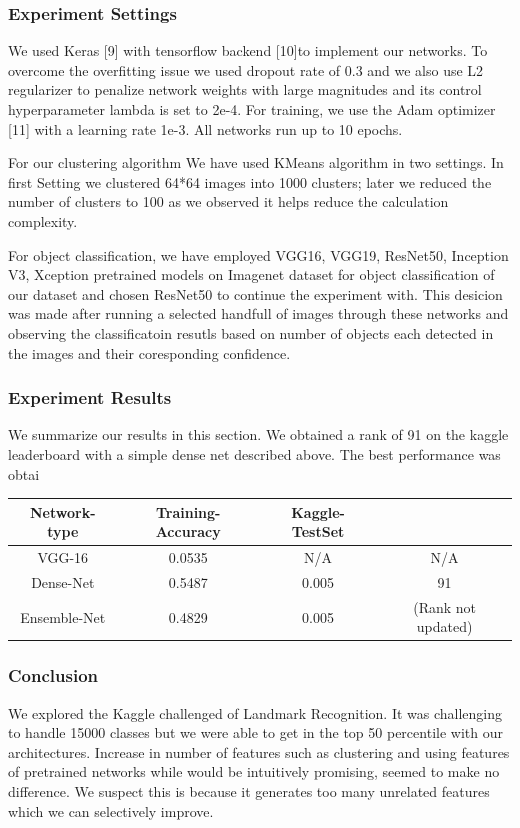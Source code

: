 \documentclass{article}
\begin{document}
\subsubsection{Experiment Settings}
We used Keras [9] with tensorflow backend [10]to implement our networks. To overcome the overfitting issue we used dropout rate of 0.3 and we also use L2 regularizer to penalize network
weights with large magnitudes and its control hyperparameter  lambda is set to
2e-4. For training, we use the Adam optimizer [11] with a learning rate 1e-3. All
networks run up to 10 epochs.

For our clustering algorithm We have used KMeans algorithm in two settings. In first Setting we clustered 64*64 images into 1000 clusters; later we reduced the number of clusters to 100 as we observed it helps reduce the calculation complexity.

For object classification, we have employed VGG16, VGG19, ResNet50, Inception V3, Xception pretrained models on Imagenet dataset for object classification of our dataset and chosen ResNet50 to continue the experiment with. This desicion was made after running a selected handfull of images through these networks and observing the classificatoin resutls based on number of objects each detected in the images and their coresponding confidence.

\subsubsection{Experiment Results}

We summarize our results in this section. We obtained a rank of 91 on the kaggle leaderboard with a simple dense net described above.
The best performance was obtai
\begin{table}[t]
	\begin{center}
		\begin{tabular}{ |c|c|c|c| } 
			\hline
			Network-type & Training-Accuracy & Kaggle-TestSet\\ 
			\hline
			VGG-16 & 0.0535 & N/A & N/A \\ 
			Dense-Net & 0.5487 & 0.005 &91 \\ 
			Ensemble-Net& 0.4829 & 0.005 & (Rank not updated) \\
			 
			\hline
		\end{tabular}
	\end{center}
\end{table}

\subsubsection{Conclusion }
We explored the Kaggle challenged of Landmark Recognition. It was challenging to handle 15000 classes but we were able to get in the top 50 percentile with our architectures.
Increase in number of features such as clustering and using features of pretrained networks while would be intuitively promising, seemed to make no difference. We suspect this is because it generates too many unrelated features which we can selectively improve.
\end{document}
